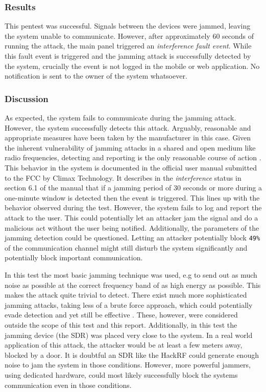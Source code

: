\subsubsection{Results}
This pentest was successful. Signals between the devices were jammed, leaving the system unable to communicate. However, after approximately 60 seconds of running the attack, the main panel triggered an \textit{interference fault event}. While this fault event is triggered and the jamming attack is successfully detected by the system, crucially the event is not logged in the mobile or web application. No notification is sent to the owner of the system whatsoever.

\subsubsection{Discussion}
As expected, the system fails to communicate during the jamming attack. However, the system successfully detects this attack. Arguably, reasonable and appropriate measures have been taken by the manufacturer in this case. Given the inherent vulnerability of jamming attacks in a shared and open medium like radio frequencies, detecting and reporting is the only reasonable course of action 
\cite{optimal-jamming-defense}. This behavior in the system is documented in the official user manual submitted to the FCC \cite{hsgw-user-manual} by Climax Technology. It describes in the \textit{interference} status in section 6.1 of the manual that if a jamming period of 30 seconds or more during a one-minute window is detected then the event is triggered. This lines up with the behavior observed during the test. However, the system fails to log and report the attack to the user. This could potentially let an attacker jam the signal and do a malicious act without the user being notified. Additionally, the parameters of the jamming detection could be questioned. Letting an attacker potentially block \texttt{49\%} of the communication channel might still disturb the system significantly and potentially block important communication.

In this test the most basic jamming technique was used, e.g to send out as much noise as possible at the correct frequency band of as high energy as possible. This makes the attack quite trivial to detect. There exist much more sophisticated jamming attacks, taking less of a brute force approach, which could potentially evade detection and yet still be effective \cite{mpitziopoulos2009survey}. These, however, were considered outside the scope of this test and this report. Additionally, in this test the jamming device (the SDR) was placed very close to the system. In a real world application of this attack, the attacker would be at least a few meters away, blocked by a door. It is doubtful an SDR like the HackRF could generate enough noise to jam the system in those conditions. However, more powerful jammers, using dedicated hardware, could most likely successfully block the systems communication even in those conditions.

